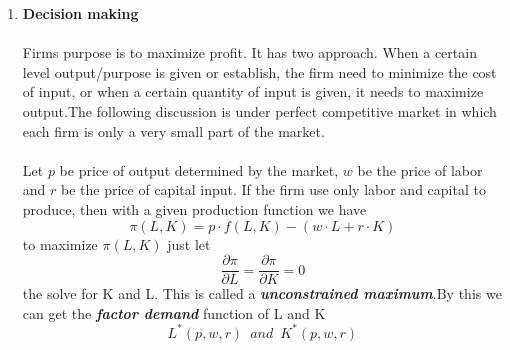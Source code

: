\documentclass[10pt]{article}
\newenvironment{changemargin}[2]{%
  \begin{list}{}{%
    \setlength{\topsep}{0pt}%
    \setlength{\leftmargin}{#1}%
    \setlength{\rightmargin}{#2}%
    \setlength{\listparindent}{\parindent}%
    \setlength{\itemindent}{\parindent}%
    \setlength{\parsep}{\parskip}%
  }%
  \item[]}{\end{list}}
\begin{document}
\begin{changemargin}{-0.125in}{0in}
\begin{enumerate}
\begin{enumerate}
        \item \textbf{Decision making}
        \\
        \\
        Firms purpose is to maximize profit. It has two approach. When a certain level output/purpose is given or establish, the firm need to minimize the cost of input, or when a certain quantity of input is given, it needs to maximize output.The following discussion is under perfect competitive market in which each firm is only a very small part of the market.
        \\
        \\
        Let $p$ be price of output determined by the market, $w$ be the price of labor and $r$ be the price of capital input. If the firm use only labor and capital to produce, then with a given production function we have 
        \[
        \pi (L,K) = p\cdot f(L,K) - (w\cdot L + r\cdot K)
        \]
        to maximize $\pi(L,K)$ just let 
        \[
        \frac{\partial \pi}{ \partial L} = \frac{\partial\pi}{\partial K} = 0
        \]
        the solve for K and L. This is called a \textbf{\textit{unconstrained maximum}}.By this we can get the \textbf{\textit{factor demand}} function of L and K
        \[
        L^*(p,w,r)\,\,\,and\,\,\,K^*(p,w,r)
        \]
        

\end{enumerate}
\end{enumerate}
\end{changemargin}
\end{document}
